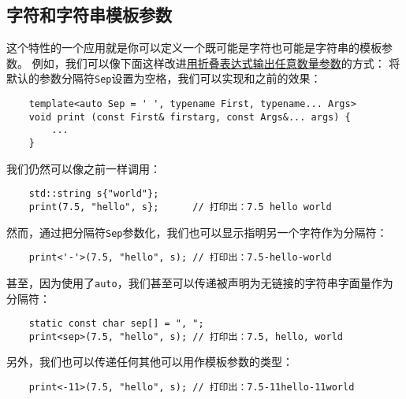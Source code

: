 \subsection{字符和字符串模板参数}\label{ch13.1.1}
这个特性的一个应用就是你可以定义一个既可能是字符也可能是字符串的模板参数。
例如，我们可以像下面这样改进\hyperref[输出任意个参数的print]{用折叠表达式输出任意数量参数}的方式：
将默认的参数分隔符\texttt{Sep}设置为空格，我们可以实现和之前的效果：
\begin{lstlisting}
    template<auto Sep = ' ', typename First, typename... Args>
    void print (const First& firstarg, const Args&... args) {
        ...
    }
\end{lstlisting}
我们仍然可以像之前一样调用：
\begin{lstlisting}
    std::string s{"world"};
    print(7.5, "hello", s};      // 打印出：7.5 hello world
\end{lstlisting}
然而，通过把分隔符\texttt{Sep}参数化，我们也可以显示指明另一个字符作为分隔符：
\begin{lstlisting}
    print<'-'>(7.5, "hello", s); // 打印出：7.5-hello-world
\end{lstlisting}
甚至，因为使用了\texttt{auto}，我们甚至可以传递被声明为无链接的字符串字面量作为分隔符：
\begin{lstlisting}
    static const char sep[] = ", ";
    print<sep>(7.5, "hello", s); // 打印出：7.5, hello, world
\end{lstlisting}
另外，我们也可以传递任何其他可以用作模板参数的类型：
\begin{lstlisting}
    print<-11>(7.5, "hello", s); // 打印出：7.5-11hello-11world
\end{lstlisting}

